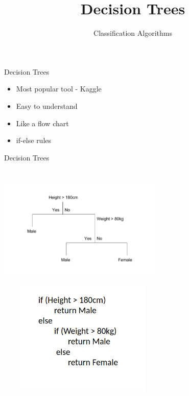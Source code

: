 \documentclass[aspectratio=169,14pt]{beamer}
\title[Decision Trees]{Decision Trees}
\begin{document}
{ \1
\begin{frame} \vspace{35pt}
	\subtitle{Classification Algorithms}
	\maketitle
	\end{frame}
	}

\begin{frame}{Decision Trees}
\begin{itemize}
\item Most popular tool - Kaggle
\item Easy to understand 
\item Like a flow chart
\item if-else rules
\end{itemize}
\end{frame}

\begin{frame}[fragile]{Decision Trees}
\begin{columns}
\hspace{8cm} \includegraphics[width=8cm,height=5.5cm]{Images/dtree1_3.png}
\includegraphics[width=8cm,height=5.5cm]{Images/dtree1_3a.png}
\end{columns}
\end{frame}
\end{document}
